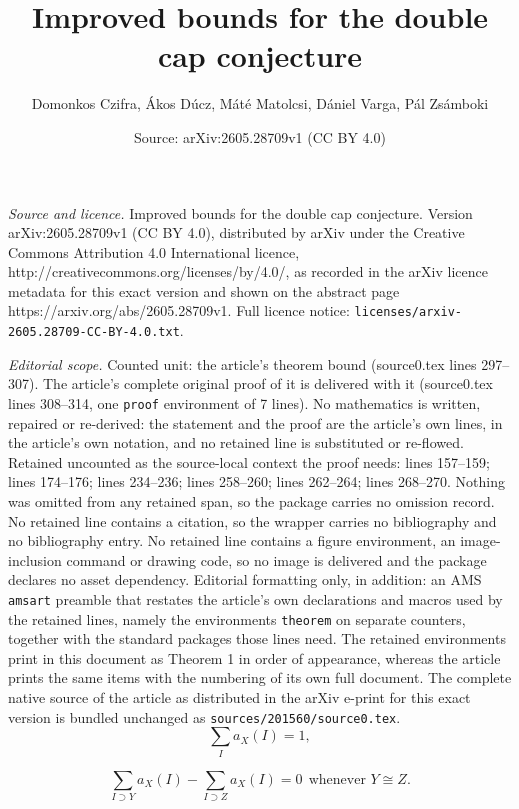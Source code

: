 \documentclass[10pt,a4paper]{amsart}
\title{Improved bounds for the double cap conjecture}
\author{Domonkos Czifra, \'Akos D\'ucz, M\'at\'e Matolcsi, D\'aniel Varga, P\'al Zs\'amboki}
\date{Source: arXiv:2605.28709v1 (CC BY 4.0)}
\begin{document}
\maketitle

\noindent\emph{Source and licence.} Improved bounds for the double cap conjecture. Version arXiv:2605.28709v1 (CC BY 4.0), distributed by arXiv under the Creative Commons Attribution 4.0 International licence, http://creativecommons.org/licenses/by/4.0/, as recorded in the arXiv licence metadata for this exact version and shown on the abstract page https://arxiv.org/abs/2605.28709v1. Full licence notice: \texttt{licenses/arxiv-2605.28709-CC-BY-4.0.txt}.\par\smallskip

\noindent\textit{Editorial scope.} Counted unit: the article's theorem bound (source0.tex lines 297--307). The article's complete original proof of it is delivered with it (source0.tex lines 308--314, one \texttt{proof} environment of 7 lines). No mathematics is written, repaired or re-derived: the statement and the proof are the article's own lines, in the article's own notation, and no retained line is substituted or re-flowed.  Retained uncounted as the source-local context the proof needs: lines 157--159; lines 174--176; lines 234--236; lines 258--260; lines 262--264; lines 268--270.  Nothing was omitted from any retained span, so the package carries no omission record.  No retained line contains a citation, so the wrapper carries no bibliography and no bibliography entry.  No retained line contains a figure environment, an image-inclusion command or drawing code, so no image is delivered and the package declares no asset dependency.  Editorial formatting only, in addition: an AMS \texttt{amsart} preamble that restates the article's own declarations and macros used by the retained lines, namely the environments \texttt{theorem} on separate counters, together with the standard packages those lines need.  The retained environments print in this document as Theorem 1 in order of appearance, whereas the article prints the same items with the numbering of its own full document.  The complete native source of the article as distributed in the arXiv e-print for this exact version is bundled unchanged as \texttt{sources/201560/source0.tex}.
\begin{equation}\label{iet}
\sum_I a_X(I)= 1,    
\end{equation}

\begin{equation}\label{iec}
\sum_{I\supset Y} a_X(I)-\sum_{I\supset Z} a_X(I)=0  \ \ {\textrm{whenever \ }} Y\cong Z.
\end{equation}
\end{document}

